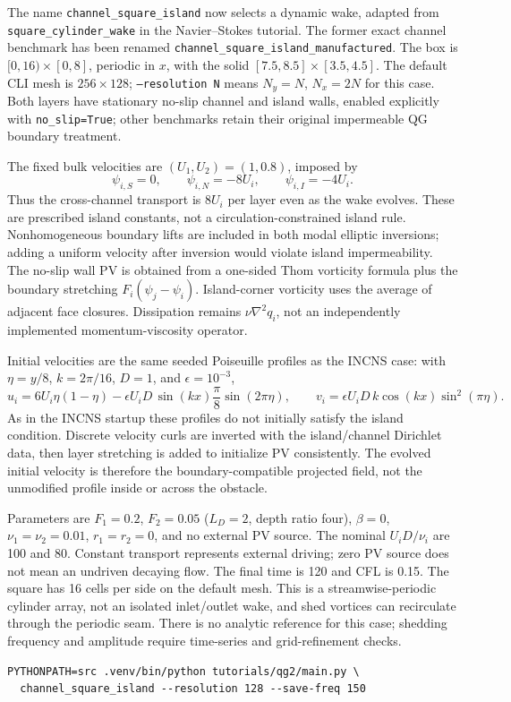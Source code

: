 \documentclass[11pt]{article}
\newcommand{\lap}{\nabla^2}
\begin{document}
The name \texttt{channel\_square\_island} now selects a dynamic wake,
adapted from \texttt{square\_cylinder\_wake} in the Navier--Stokes tutorial.
The former exact channel benchmark has been renamed
\texttt{channel\_square\_island\_manufactured}.
The box is $[0,16)\times[0,8]$, periodic in $x$, with the solid
$[7.5,8.5]\times[3.5,4.5]$. The default CLI mesh is $256\times128$;
\texttt{--resolution N} means $N_y=N$, $N_x=2N$ for this case.
Both layers have stationary no-slip channel and island walls, enabled
explicitly with \texttt{no\_slip=True}; other benchmarks retain their
original impermeable QG boundary treatment.

The fixed bulk velocities are $(U_1,U_2)=(1,0.8)$, imposed by
\[
 \psi_{i,S}=0,\qquad \psi_{i,N}=-8U_i,\qquad \psi_{i,I}=-4U_i.
\]
Thus the cross-channel transport is $8U_i$ per layer even as the wake evolves.
These are prescribed island constants, not a circulation-constrained island rule.
Nonhomogeneous boundary lifts are included in both modal elliptic inversions;
adding a uniform velocity after inversion would violate island impermeability.
The no-slip wall PV is obtained from a one-sided Thom vorticity formula
plus the boundary stretching $F_i(\psi_j-\psi_i)$. Island-corner vorticity
uses the average of adjacent face closures. Dissipation remains $\nu\lap q_i$,
not an independently implemented momentum-viscosity operator.

Initial velocities are the same seeded Poiseuille profiles as the INCNS case:
with $\eta=y/8$, $k=2\pi/16$, $D=1$, and $\epsilon=10^{-3}$,
\[
 u_i=6U_i\eta(1-\eta)
       -\epsilon U_iD\,\sin(kx)\frac{\pi}{8}\sin(2\pi\eta),\qquad
 v_i=\epsilon U_iD\,k\cos(kx)\sin^2(\pi\eta).
\]
As in the INCNS startup these profiles do not initially satisfy the island
condition. Discrete velocity curls are inverted with the island/channel
Dirichlet data, then layer stretching is added to initialize PV consistently.
The evolved initial velocity is therefore the boundary-compatible projected
field, not the unmodified profile inside or across the obstacle.

Parameters are $F_1=0.2$, $F_2=0.05$ ($L_D=2$, depth ratio four),
$\beta=0$, $\nu_1=\nu_2=0.01$, $r_1=r_2=0$, and no external PV source.
The nominal $U_iD/\nu_i$ are 100 and 80. Constant transport represents
external driving; zero PV source does not mean an undriven decaying flow.
The final time is 120 and CFL is 0.15. The square has 16 cells per side
on the default mesh. This is a streamwise-periodic cylinder array, not
an isolated inlet/outlet wake, and shed vortices can recirculate through
the periodic seam. There is no analytic reference for this case; shedding
frequency and amplitude require time-series and grid-refinement checks.
\begin{verbatim}
PYTHONPATH=src .venv/bin/python tutorials/qg2/main.py \
  channel_square_island --resolution 128 --save-freq 150
\end{verbatim}
\end{document}
